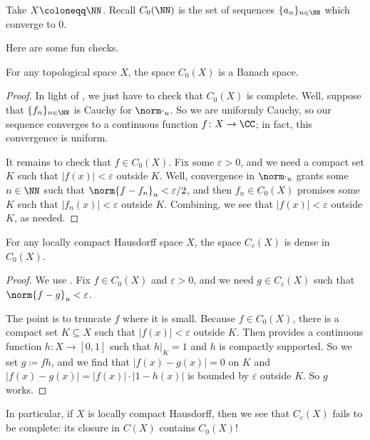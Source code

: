 \documentclass[../notes.tex]{subfiles}
\begin{document}
\begin{example}
	Take $X\coloneqq\NN$. Recall $C_0(\NN)$ is the set of sequences $\{a_n\}_{n\in\NN}$ which converge to $0$.
\end{example}
Here are some fun checks.
\begin{proposition}
	For any topological space $X$, the space $C_0(X)$ is a Banach space.
\end{proposition}
\begin{proof}
	In light of , we just have to check that $C_0(X)$ is complete. Well, suppose that $\{f_n\}_{n\in\NN}$ is Cauchy for $\norm\cdot_u$. So we are uniformly Cauchy, so our sequence converges to a continuous function $f\colon X\to\CC$; in fact, this convergence is uniform.
	
	It remains to check that $f\in C_0(X)$. Fix some $\varepsilon>0$, and we need a compact set $K$ such that $\left|f(x)\right|<\varepsilon$ outside $K$. Well, convergence in $\norm\cdot_u$ grants some $n\in\NN$ such that $\norm{f-f_n}_u<\varepsilon/2$, and then $f_n\in C_0(X)$ promises some $K$ such that $\left|f_n(x)\right|<\varepsilon$ outside $K$. Combining, we see that $\left|f(x)\right|<\varepsilon$ outside $K$, as needed.
\end{proof}
\begin{proposition}
	For any locally compact Hausdorff space $X$, the space $C_c(X)$ is dense in $C_0(X)$.
\end{proposition}
\begin{proof}
	We use . Fix $f\in C_0(X)$ and $\varepsilon>0$, and we need $g\in C_c(X)$ such that $\norm{f-g}_u<\varepsilon$.

	The point is to truncate $f$ where it is small. Because $f\in C_0(X)$, there is a compact set $K\subseteq X$ such that $\left|f(x)\right|<\varepsilon$ outside $K$. Then  provides a continuous function $h\colon X\to[0,1]$ such that $h|_K=1$ and $h$ is compactly supported. So we set $g\coloneqq fh$, and we find that $\left|f(x)-g(x)\right|=0$ on $K$ and $\left|f(x)-g(x)\right|=\left|f(x)\right|\cdot\left|1-h(x)\right|$ is bounded by $\varepsilon$ outside $K$. So $g$ works.
\end{proof}
\begin{remark}
	In particular, if $X$ is locally compact Hausdorff, then we see that $C_c(X)$ fails to be complete: its closure in $C(X)$ contains $C_0(X)$!
\end{remark}
\end{document}
